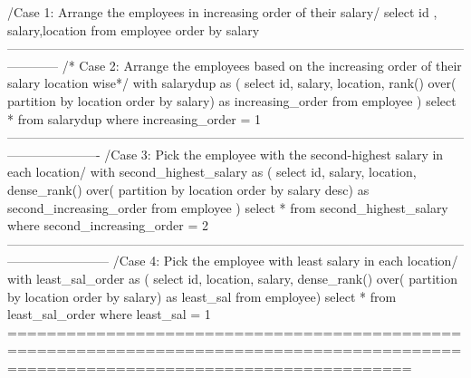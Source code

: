 /Case 1: Arrange the employees in increasing order of their salary/
select id , salary,location from employee order by salary
------------------------------------------------------------------------------------------------------------------------
/* Case 2: Arrange the employees based on the increasing order of their salary location wise*/
with salarydup as (
select
 id,
 salary,
 location, 
rank()
over( partition by location order by salary) as increasing_order 
from employee
)
select * from salarydup where increasing_order = 1
----------------------------------------------------------------------------------------------------------------------------------
/Case 3: Pick the employee with the second-highest salary in each location/
with second_highest_salary as (
select
 id,
 salary,
 location, 
dense_rank()
over( partition by location order by salary desc) as second_increasing_order 
from employee
)
select * from second_highest_salary where second_increasing_order = 2
------------------------------------------------------------------------------------------------------------------------------------
/Case 4: Pick the employee with least salary in each location/
with least_sal_order as (
select id, location, salary,
dense_rank()
over( partition by location order by salary) as least_sal
from employee)
select * from least_sal_order where least_sal = 1
=====================================================================================================================================